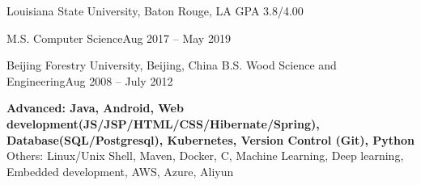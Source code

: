 \documentclass[10pt,a4paper]{article}
\begin{document}

\spacedhrule{0em}{-1em}

%
%


\headedsection
{Louisiana State University, Baton Rouge, LA}
{GPA 3.8/4.00}{

  \headedsubsection
  {M.S. Computer Science}{Aug 2017
    -- May 2019}{}
}
\vspace{0.1em}
\headedsection
{Beijing Forestry University, Beijing, China}{
	\headedsubsection
  {B.S. Wood Science and Engineering}{Aug 2008 -- July 2012}{}
}


\spacedhrule{0.1em}{-0.8em}
\textbf{Advanced: Java, Android, Web development(JS/JSP/HTML/CSS/Hibernate/Spring), Database(SQL/Postgresql), Kubernetes, Version Control (Git), Python}\\
Others: Linux/Unix Shell, Maven, Docker, C, Machine Learning, Deep learning, Embedded development, AWS, Azure, Aliyun
\end{document}
